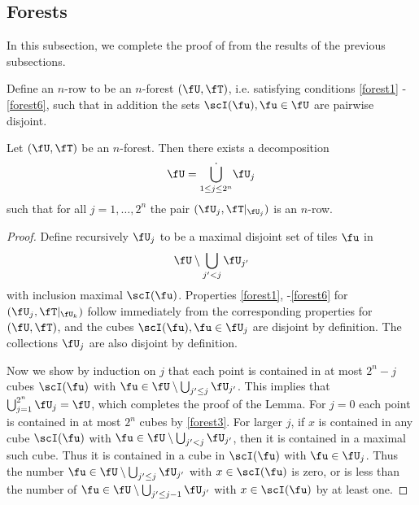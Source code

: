 \subsection{Forests}
In this subsection, we complete the proof of  from the results of the previous subsections.

Define an $n$-row to be an $n$-forest $(\fU, \fT)$, i.e. satisfying conditions \eqref{forest1} - \eqref{forest6}, such that in addition the sets $\scI(\fu), \fu \in \fU$ are pairwise disjoint.

\begin{lemma}
    \label{forest-row-decomposition}
    \leanok
    Let $(\fU, \fT)$ be an $n$-forest. Then there exists a decomposition
    $$
        \fU = \dot{\bigcup_{1 \le j \le 2^n}} \fU_j
    $$
    such that for all $j = 1, \dotsc, 2^n$ the pair $(\fU_j, \fT|_{\fU_j})$ is an $n$-row.
\end{lemma}

\begin{proof}
    \leanok
    Define recursively $\fU_j$ to be a maximal disjoint set of tiles $\fu$ in
    $$
        \fU \setminus \bigcup_{j' < j} \fU_{j'}
    $$
    with inclusion maximal $\scI(\fu)$. Properties \eqref{forest1}, -\eqref{forest6} for $(\fU_j, \fT|_{\fU_k})$ follow immediately from the corresponding properties for $(\fU, \fT)$, and the cubes $\scI(\fu), \fu \in \fU_j$ are disjoint by definition. The collections $\fU_j$ are also disjoint by definition.

    Now we show by induction on $j$ that each point is contained in at most $2^n - j$ cubes $\scI(\fu)$ with $\fu \in \fU \setminus \bigcup_{j' \le j} \fU_{j'}$. This implies that $\bigcup_{j = 1}^{2^n} \fU_j = \fU$, which completes the proof of the Lemma. For $j = 0$ each point is contained in at most $2^n$ cubes by \eqref{forest3}. For larger $j$, if $x$ is contained in any cube $\scI(\fu)$ with $\fu \in \fU \setminus \bigcup_{j' < j} \fU_{j'}$, then it is contained in a maximal such cube. Thus it is contained in a cube in $\scI(\fu)$ with $\fu \in \fU_j$. Thus the number $\fu \in \fU \setminus \bigcup_{j' \le j} \fU_{j'}$ with $x\in \scI(\fu)$ is zero, or is less than the number of $\fu \in \fU \setminus \bigcup_{j' \le j-1} \fU_{j'}$ with $x \in \scI(\fu)$ by at least one.
\end{proof}

